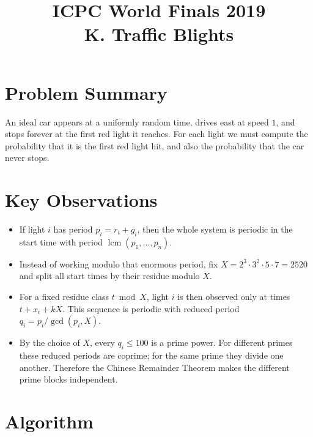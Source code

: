 \documentclass[11pt]{article}
\title{ICPC World Finals 2019\\K. Traffic Blights}
\author{}
\date{}
\begin{document}
\maketitle

\section*{Problem Summary}

An ideal car appears at a uniformly random time, drives east at speed $1$, and stops forever at the
first red light it reaches. For each light we must compute the probability that it is the first red light hit,
and also the probability that the car never stops.

\section*{Key Observations}

\begin{itemize}[leftmargin=*]
    \item If light $i$ has period $p_i=r_i+g_i$, then the whole system is periodic in the start time with
    period $\operatorname{lcm}(p_1,\dots,p_n)$.
    \item Instead of working modulo that enormous period, fix
    $X = 2^3 \cdot 3^2 \cdot 5 \cdot 7 = 2520$ and split all start times by their residue modulo $X$.
    \item For a fixed residue class $t \bmod X$, light $i$ is then observed only at times
    $t + x_i + kX$. This sequence is periodic with reduced period
    $q_i = p_i / \gcd(p_i, X)$.
    \item By the choice of $X$, every $q_i \le 100$ is a prime power.
    For different primes these reduced periods are coprime; for the same prime they divide one another.
    Therefore the Chinese Remainder Theorem makes the different prime blocks independent.
\end{itemize}

\section*{Algorithm}
\end{document}
